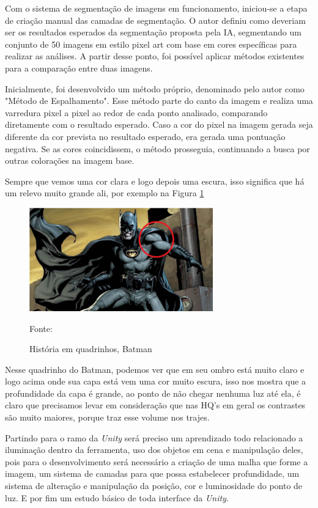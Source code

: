 Com o sistema de segmentação de imagens em funcionamento, iniciou-se a etapa de criação manual das camadas de segmentação. O autor definiu como deveriam ser os resultados esperados da segmentação proposta pela IA, segmentando um conjunto de 50 imagens em estilo pixel art com base em cores específicas para realizar as análises. A partir desse ponto, foi possível aplicar métodos existentes para a comparação entre duas imagens.

Inicialmente, foi desenvolvido um método próprio, denominado pelo autor como "Método de Espalhamento". Esse método parte do canto da imagem e realiza uma varredura pixel a pixel ao redor de cada ponto analisado, comparando diretamente com o resultado esperado. Caso a cor do pixel na imagem gerada seja diferente da cor prevista no resultado esperado, era gerada uma pontuação negativa. Se as cores coincidissem, o método prosseguia, continuando a busca por outras colorações na imagem base.


Sempre que vemos uma cor clara e logo depois uma escura, isso significa que há um relevo muito grande ali, por exemplo  na Figura \ref{fig:batman}

\begin{figure}[ht]
    \caption{História em quadrinhos, Batman}
    \centering
    \includegraphics{imagens/batman.png}

    Fonte: \cite{Bazela2022-yg}
    \label{fig:batman}
\end{figure}

Nesse quadrinho do Batman, podemos ver que em seu ombro está muito claro e logo acima onde sua capa está vem uma cor muito escura, isso nos mostra que a profundidade da capa é grande, ao ponto de não chegar nenhuma luz até ela, é claro que precisamos levar em consideração que nas HQ’s em geral os contrastes são muito maiores, porque traz esse volume nos trajes. 

Partindo para o ramo da \textit{Unity} será preciso um aprendizado todo relacionado a iluminação dentro da ferramenta, uso dos objetos em cena e manipulação deles, pois para o desenvolvimento será necessário a criação de uma malha que forme a imagem, um sistema de camadas para que possa estabelecer profundidade, um sistema de alteração e manipulação da posição, cor e luminosidade do ponto de luz. E por fim um estudo básico de toda interface da \textit{Unity}.

